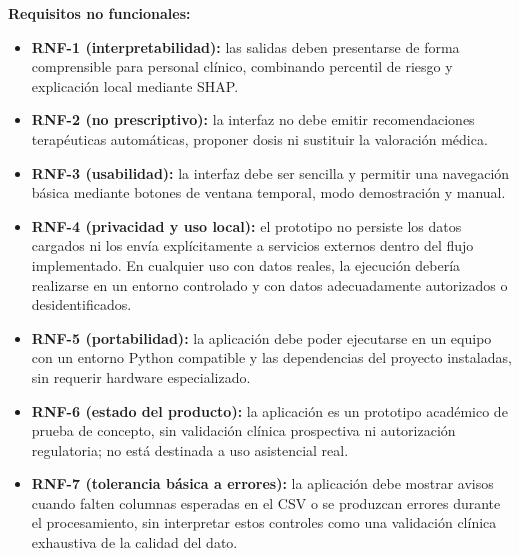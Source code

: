 \documentclass[
  spanish,
  a4paper,
  12pt,
  twoside]{memoir}
\begin{document}
\textbf{Requisitos no funcionales:}
\begin{itemize}
  \item \textbf{RNF-1 (interpretabilidad):} las salidas deben presentarse de forma comprensible para personal clínico, combinando percentil de riesgo y explicación local mediante SHAP.
  \item \textbf{RNF-2 (no prescriptivo):} la interfaz no debe emitir recomendaciones terapéuticas automáticas, proponer dosis ni sustituir la valoración médica.
  \item \textbf{RNF-3 (usabilidad):} la interfaz debe ser sencilla y permitir una navegación básica mediante botones de ventana temporal, modo demostración y manual.
  \item \textbf{RNF-4 (privacidad y uso local):} el prototipo no persiste los datos cargados ni los envía explícitamente a servicios externos dentro del flujo implementado. En cualquier uso con datos reales, la ejecución debería realizarse en un entorno controlado y con datos adecuadamente autorizados o desidentificados.
  \item \textbf{RNF-5 (portabilidad):} la aplicación debe poder ejecutarse en un equipo con un entorno Python compatible y las dependencias del proyecto instaladas, sin requerir hardware especializado.
  \item \textbf{RNF-6 (estado del producto):} la aplicación es un prototipo académico de prueba de concepto, sin validación clínica prospectiva ni autorización regulatoria; no está destinada a uso asistencial real.
  \item \textbf{RNF-7 (tolerancia básica a errores):} la aplicación debe mostrar avisos cuando falten columnas esperadas en el CSV o se produzcan errores durante el procesamiento, sin interpretar estos controles como una validación clínica exhaustiva de la calidad del dato.
\end{itemize}
\end{document}
